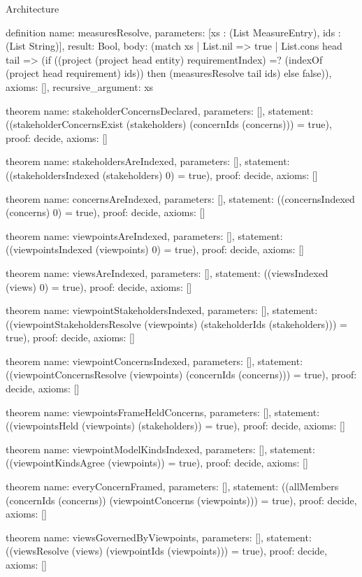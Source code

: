 \begin{lexlean}{Architecture}
\begin{semanticmodule}
definition{
  name: measuresResolve,
  parameters: [xs : (List MeasureEntry), ids : (List String)],
  result: Bool,
  body: (match xs
    | List.nil => true
    | List.cons head tail => (if ((project (project head entity) requirementIndex) =? (indexOf (project head requirement) ids)) then (measuresResolve tail ids) else false)),
  axioms: [],
  recursive_argument: xs
}

theorem{
  name: stakeholderConcernsDeclared,
  parameters: [],
  statement: ((stakeholderConcernsExist (stakeholders) (concernIds (concerns))) = true),
  proof: decide{},
  axioms: []
}

theorem{
  name: stakeholdersAreIndexed,
  parameters: [],
  statement: ((stakeholdersIndexed (stakeholders) 0) = true),
  proof: decide{},
  axioms: []
}

theorem{
  name: concernsAreIndexed,
  parameters: [],
  statement: ((concernsIndexed (concerns) 0) = true),
  proof: decide{},
  axioms: []
}

theorem{
  name: viewpointsAreIndexed,
  parameters: [],
  statement: ((viewpointsIndexed (viewpoints) 0) = true),
  proof: decide{},
  axioms: []
}

theorem{
  name: viewsAreIndexed,
  parameters: [],
  statement: ((viewsIndexed (views) 0) = true),
  proof: decide{},
  axioms: []
}

theorem{
  name: viewpointStakeholdersIndexed,
  parameters: [],
  statement: ((viewpointStakeholdersResolve (viewpoints) (stakeholderIds (stakeholders))) = true),
  proof: decide{},
  axioms: []
}

theorem{
  name: viewpointConcernsIndexed,
  parameters: [],
  statement: ((viewpointConcernsResolve (viewpoints) (concernIds (concerns))) = true),
  proof: decide{},
  axioms: []
}

theorem{
  name: viewpointsFrameHeldConcerns,
  parameters: [],
  statement: ((viewpointsHeld (viewpoints) (stakeholders)) = true),
  proof: decide{},
  axioms: []
}

theorem{
  name: viewpointModelKindsIndexed,
  parameters: [],
  statement: ((viewpointKindsAgree (viewpoints)) = true),
  proof: decide{},
  axioms: []
}

theorem{
  name: everyConcernFramed,
  parameters: [],
  statement: ((allMembers (concernIds (concerns)) (viewpointConcerns (viewpoints))) = true),
  proof: decide{},
  axioms: []
}

theorem{
  name: viewsGovernedByViewpoints,
  parameters: [],
  statement: ((viewsResolve (views) (viewpointIds (viewpoints))) = true),
  proof: decide{},
  axioms: []
}


\end{semanticmodule}
\end{lexlean}
